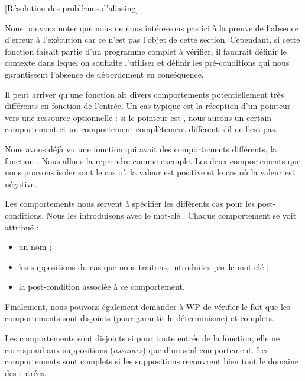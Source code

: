 \documentclass[middle]{zmdocument}
\begin{document}
[Résolution des problèmes d'aliasing]


Nous pouvons noter que nous ne nous intéressons pas ici à la preuve de 
l'absence d'erreur à l'exécution car ce n'est pas l'objet de cette section.
Cependant, si cette fonction faisait partie d'un programme complet à vérifier,
il faudrait définir le contexte dans lequel on souhaite l'utiliser et définir
les pré-conditions qui nous garantissent l'absence de débordement en conséquence.





Il peut arriver qu'une fonction ait divers comportements potentiellement très
différents en fonction de l'entrée. Un cas typique est la réception d'un 
pointeur vers une ressource optionnelle : si le pointeur est , nous 
aurons un certain comportement et un comportement complètement différent s'il ne 
l'est pas.



Nous avons déjà vu une fonction qui avait des comportements différents, la 
fonction . Nous allons la reprendre comme exemple. Les deux 
comportements que nous pouvons isoler sont le cas où la valeur est positive et
le cas où la valeur est négative.



Les comportements nous servent à spécifier les différents cas pour les 
post-conditions. Nous les introduisons avec le mot-clé . 
Chaque comportement se voit attribué :



\begin{itemize}
\item un nom ;
\item les suppositions du cas que nous traitons, introduites par le mot 
clé  ;
\item la post-condition associée à ce comportement.
\end{itemize}


Finalement, nous pouvons également demander à WP
de vérifier le fait que les comportements sont disjoints (pour garantir 
le déterminisme) et complets.



Les comportements sont disjoints si pour toute entrée de la fonction, elle ne
correspond aux suppositions (\textit{assumes}) que d'un seul comportement. Les 
comportements sont complets si les suppositions recouvrent bien tout le domaine
des entrées.
\end{document}
